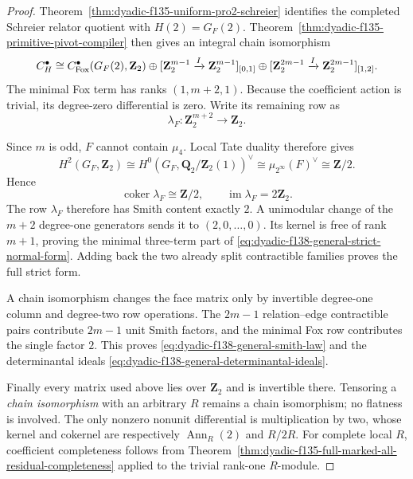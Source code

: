 \documentclass[11pt]{article}
\theoremstyle{definition}
\begin{document}
\begin{proof}
Theorem~\ref{thm:dyadic-f135-uniform-pro2-schreier}
identifies the completed Schreier relator quotient
with $H(2)=G_F(2)$.  Theorem~\ref{thm:dyadic-f135-primitive-pivot-compiler}
then gives an integral chain isomorphism
\[
C_H^\bullet\cong
C_{\rm Fox}^\bullet(G_F(2),\mathbf Z_2)
\oplus
[\mathbf Z_2^{m-1}\xrightarrow{I}
 \mathbf Z_2^{m-1}]_{[0,1]}
\oplus
[\mathbf Z_2^{2m-1}\xrightarrow{I}
 \mathbf Z_2^{2m-1}]_{[1,2]} .
\]
The minimal Fox term has ranks $(1,m+2,1)$.
Because the coefficient action is trivial, its
degree-zero differential is zero.  Write its
remaining row as
\[
\lambda_F:\mathbf Z_2^{m+2}\longrightarrow\mathbf Z_2 .
\]

Since $m$ is odd, $F$ cannot contain $\mu_4$.
Local Tate duality therefore gives
\[
H^2(G_F,\mathbf Z_2)
\cong
H^0(G_F,\mathbf Q_2/\mathbf Z_2(1))^\vee
\cong\mu_{2^\infty}(F)^\vee
\cong\mathbf Z/2.
\]
Hence
\[
\operatorname{coker}\lambda_F\cong\mathbf Z/2,
\qquad
\operatorname{im}\lambda_F=2\mathbf Z_2.
\]
The row $\lambda_F$ therefore has Smith content
exactly $2$.  A unimodular change of the $m+2$
degree-one generators sends it to
$(2,0,\ldots,0)$.
Its kernel is free of rank $m+1$, proving the
minimal three-term part of
\eqref{eq:dyadic-f138-general-strict-normal-form}.
Adding back the two already split contractible
families proves the full strict form.

A chain isomorphism changes the face matrix only
by invertible degree-one column and degree-two row
operations.  The $2m-1$ relation--edge
contractible pairs contribute $2m-1$ unit Smith
factors, and the minimal Fox row contributes the
single factor $2$.  This proves
\eqref{eq:dyadic-f138-general-smith-law} and the
determinantal ideals
\eqref{eq:dyadic-f138-general-determinantal-ideals}.

Finally every matrix used above lies over
$\mathbf Z_2$ and is invertible there.
Tensoring a \emph{chain isomorphism} with an
arbitrary $R$ remains a chain isomorphism; no
flatness is involved.  The only nonzero
nonunit differential is multiplication by two,
whose kernel and cokernel are respectively
$\operatorname{Ann}_R(2)$ and $R/2R$.
For complete local $R$, coefficient completeness
follows from
Theorem~\ref{thm:dyadic-f135-full-marked-all-residual-completeness}
applied to the trivial rank-one $R$-module.
\end{proof}
\end{document}
